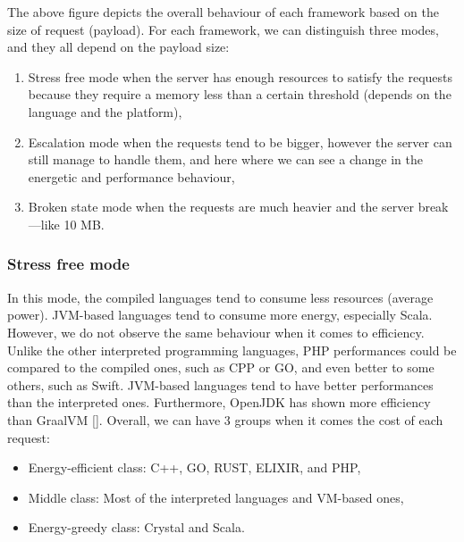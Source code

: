 The above figure depicts the overall behaviour of each framework based on the size of request (payload).
For each framework, we can distinguish three modes, and they all depend on the payload size:
\begin{enumerate}
    \item \textsf{Stress free} mode when the server has enough resources to satisfy the requests because they require a memory less than a certain threshold (depends on the language and the platform),
    \item \textsf{Escalation} mode when the requests tend to be bigger, however the server can still manage to handle them, and here where we can see a change in the energetic and performance behaviour,
    \item \textsf{Broken state} mode when the requests are much heavier and the server break—like 10 MB.%
\end{enumerate}

\subsubsection{Stress free mode}
In this mode, the compiled languages tend to consume less resources (average power).
JVM-based languages tend to consume more energy, especially Scala.
However, we do not observe the same behaviour when it comes to efficiency.
Unlike the other interpreted programming languages, PHP performances could be compared to the compiled ones, such as CPP or GO, and even better to some others, such as Swift.
JVM-based languages tend to have better performances than the interpreted ones.
Furthermore, OpenJDK has shown more efficiency than GraalVM [].
Overall, we can have 3 groups when it comes the cost of each request:
\begin{itemize}
    \item Energy-efficient class: C++, GO, RUST, ELIXIR, and PHP,
    \item Middle class: Most of the interpreted languages and VM-based ones,
    \item Energy-greedy class: Crystal and Scala.
\end{itemize}

